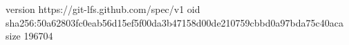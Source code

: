 version https://git-lfs.github.com/spec/v1
oid sha256:50a62803fc0eab56d15ef5f00da3b47158d00de210759cbbd0a97bda75c40aca
size 196704
